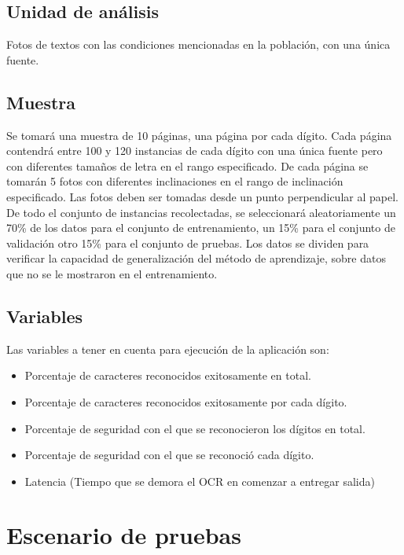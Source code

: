 \documentclass[a4paper, 11pt, oneside]{report}
\begin{document}
\subsection{Unidad de análisis}

Fotos de textos con las condiciones mencionadas en la población, con una única fuente.

\subsection{Muestra}

Se tomará una muestra de 10 páginas, una página por cada dígito. Cada página contendrá entre 100 y 120 instancias de cada dígito con una única fuente pero con diferentes tamaños de letra en el rango especificado. De cada página se tomarán 5 fotos con diferentes inclinaciones en el rango de inclinación especificado. Las fotos deben ser tomadas desde un punto perpendicular al papel. De todo el conjunto de instancias recolectadas, se seleccionará aleatoriamente un 70\% de los datos para el conjunto de entrenamiento, un 15\% para el conjunto de validación otro 15\% para el conjunto de pruebas. Los datos se dividen para verificar la capacidad de generalización del método de aprendizaje, sobre datos que no se le mostraron en el entrenamiento.

\subsection{Variables}

Las variables a tener en cuenta para ejecución de la aplicación son:
\begin{itemize}
\item Porcentaje de caracteres reconocidos exitosamente en total.
\item Porcentaje de caracteres reconocidos exitosamente por cada dígito.
\item Porcentaje de seguridad con el que se reconocieron los dígitos en total.
\item Porcentaje de seguridad con el que se reconoció cada dígito.
\item Latencia (Tiempo que se demora el OCR en comenzar a entregar salida)
\end{itemize}

\section{Escenario de pruebas}
\label{sect:testEnvironment}
\end{document}
